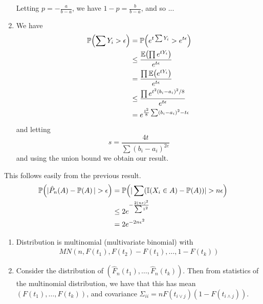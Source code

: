 \begin{exercises}
\begin{enumerate}
    Letting $p = -\frac{a}{b-a}$, we have $1-p = \frac{b}{b-a}$, and
    so ...
  \item We have
    \begin{align}
      \label{eq:6}
      \Prob{\sum Y_{i} > \epsilon} &= \Prob{e^{t \sum Y_{i}} > e^{t
          \epsilon}} \\
      &\leq \frac{\E{\prod e^{t Y_{i}}}}{e^{t \epsilon}} \\
      &= \frac{\prod \E{e^{tY_{i}}}}{e^{t \epsilon}} \\
      &\leq \frac{\prod e^{t^{2}(b_{i} - a_{i})^{2} / 8}}{e^{t
          \epsilon}} \\
      &= e^{\frac{t^{2}}{8}\sum (b_{i} - a_{i})^{2} - t \epsilon}
    \end{align}
    and letting
    \begin{equation}
      \label{eq:7}
      s = \frac{4t}{\sum (b_{i} - a_{i})^{2e}}
    \end{equation} and using the union bound we obtain our result.    
  \end{enumerate}
\item
  This follows easily from the previous result.
  \begin{align}
    \label{eq:8}
    \Prob{|\hat P_{n}(A) - \Prob{A}| > \epsilon} &= \Prob{|\sum
      (\I{X_{i} \in A} - \Prob{A})| > n \epsilon} \\
    &\leq 2 e^{-\frac{2 (n \epsilon)^{2}}{\sum 1^{2}}} \\
    &= 2 e^{-2 n \epsilon^{2}}
  \end{align}
\item
  \begin{enumerate}
  \item
      Distribution is multinomial (multivariate binomial) with
      \begin{align}
        \label{eq:9}
        MN(n, F(t_{1}), F(t_{2}) - F(t_{1}), \dots, 1 - F(t_{k}))
      \end{align}
    \item Consider the distribution of $(\hat F_{n}(t_{1}), \dots,
      \hat F_{n}(t_{k}))$.  Then from statistics of the multinomial
      distribution, we have that this has mean $(F(t_{1}), \dots,
      F(t_{k}))$, and covariance $\Sigma_{ii} = nF(t_{i \vee j})(1 -
      F(t_{i \wedge j}))$.


\end{enumerate}
\end{exercises}
